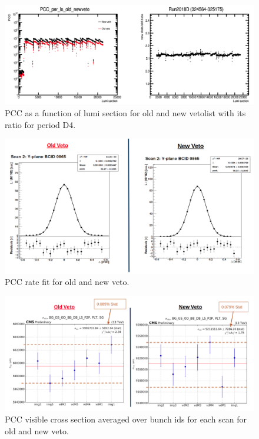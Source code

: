 \begin{figure}[!htp]
\centering
\includegraphics[width=1\textwidth]{ashish_thesis/Run2018D4_old_new_veto.png}
\caption{%
    PCC as a function of lumi section for old and new vetolist with its ratio for period D4.
}
\label{fig:old_new_veto_D3}
\end{figure}

\begin{figure}[!htp]
\centering
\includegraphics[width=1\textwidth]{ashish_thesis/vdm_fit_old_new_veto.png}
\caption{%
  PCC rate fit for old and new veto.
}
\label{fig:old_new_veto_vdmfit}
\end{figure}


\begin{figure}[!htp]
\centering
\includegraphics[width=1\textwidth]{ashish_thesis/sigmavis_old_new_veto.png}
\caption{%
   PCC visible cross section averaged over bunch ids for each scan for old and new veto.
}
\label{fig:old_new_veto_sigmavis}
\end{figure}


